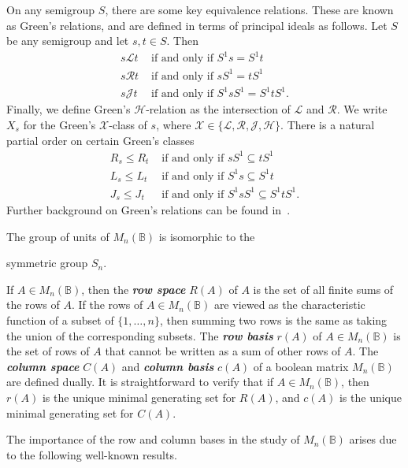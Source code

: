 \documentclass[11pt]{article}
\newcommand{\defn}[1]{\textbf{\textit{#1}}}
\numberwithin{equation}{section}
\newcommand{\B}{\mathbb{B}}
\newcommand{\Bn}{M_n(\B)}
\renewcommand{\L}{\mathscr{L}}
\newcommand{\R}{\mathscr{R}}
\newcommand{\J}{\mathscr{J}}
\renewcommand{\H}{\mathscr{H}}
\begin{document}
On any semigroup $S$, there are some key equivalence relations. These are known
as Green's relations, and are defined in terms of principal ideals as follows.
Let $S$ be any semigroup and let $s, t \in S$. Then
\begin{align*}
  s \L t &\text{ if and only if } S^1 s = S^1 t \\
  s \R t &\text{ if and only if } s S^1 = t S^1 \\
  s \J t &\text{ if and only if } S^1 s S^1 = S^1 t S^1.
\end{align*}
Finally, we define Green's $\H$-relation as the intersection of $\L$ and $\R$.
We write $X_s$ for the Green's $\mathcal{X}$-class of $s$, where
$\mathcal{X} \in \{\L, \R, \J, \H\}$.
There is a natural partial order on certain Green's classes
\begin{align*}
  R_s \leq R_t &\text{ if and only if } sS^1 \subseteq tS^1 \\
  L_s \leq L_t &\text{ if and only if } S^1s \subseteq S^1t \\
  J_s \leq J_t &\text{ if and only if } S^1 s S^1 \subseteq S^1 t S^1.
\end{align*}
Further background on Green's relations can be found in~\cite{Howie1995aa}.


The group of units of $\Bn$ is isomorphic to the

symmetric group $S_n$.

If $A \in \Bn$, then the \defn{row space} $R(A)$ of $A$ is the set of 
all finite sums of the rows of $A$.  If the rows of $A\in \Bn$ are viewed as
the characteristic function of a subset of $\{1, \ldots, n\}$, then summing two
rows is the same as taking the union of the corresponding subsets.  The
\defn{row basis} $r(A)$ of $A\in \Bn$ is the set of rows of $A$ that cannot be
written as a sum of other rows of $A$. The \defn{column space}
$C(A)$ and \defn{column basis} $c(A)$ of a boolean matrix $\Bn$ are defined
dually. It is straightforward to verify that if $A \in \Bn$, then $r(A)$ is the
unique minimal generating set for $R(A)$, and $c(A)$ is the unique minimal
generating set for $C(A)$. 


The importance of the row and column bases in the study of $\Bn$ arises due to
the following well-known results.
\end{document}
